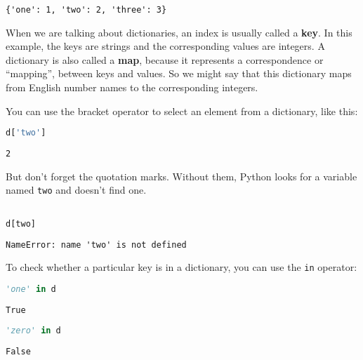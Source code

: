 \begin{lstlisting}[style=output]
{'one': 1, 'two': 2, 'three': 3}
\end{lstlisting}

When we are talking about dictionaries, an index is usually called a
\textbf{key}. In this example, the keys are strings and the
corresponding values are integers. A dictionary is also called a
\textbf{map}, because it represents a correspondence or ``mapping'',
between keys and values. So we might say that this dictionary maps from
English number names to the corresponding integers.

\pagebreak

You can use the bracket operator to select an element from a dictionary,
like this:

\begin{lstlisting}[language=Python,style=source]
d['two']
\end{lstlisting}

\begin{lstlisting}[style=output]
2
\end{lstlisting}

But don't forget the quotation marks. Without them, Python looks for a
variable named \passthrough{\lstinline!two!} and doesn't find one.

\begin{lstlisting}[language=Python,style=source]
%%expect NameError

d[two]
\end{lstlisting}

\begin{lstlisting}[style=output]
NameError: name 'two' is not defined
\end{lstlisting}

To check whether a particular key is in a dictionary, you can use the
\passthrough{\lstinline!in!} operator:

\begin{lstlisting}[language=Python,style=source]
'one' in d
\end{lstlisting}

\begin{lstlisting}[style=output]
True
\end{lstlisting}

\begin{lstlisting}[language=Python,style=source]
'zero' in d
\end{lstlisting}

\begin{lstlisting}[style=output]
False
\end{lstlisting}


